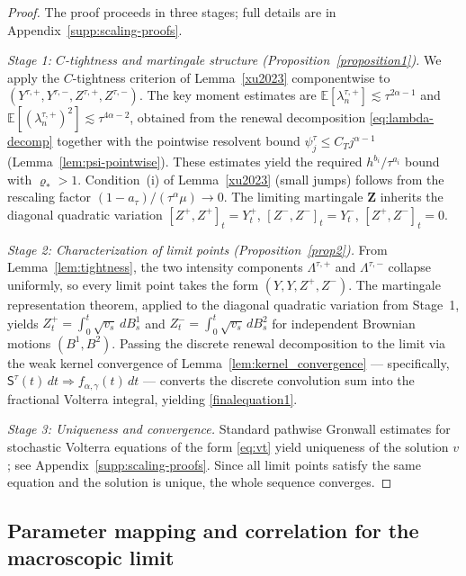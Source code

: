 \documentclass[letterpaper]{article}
\numberwithin{equation}{section}
\theoremstyle{definition}
\theoremstyle{remark}
\begin{document}
\begin{proof}
{The proof proceeds in three stages; full details are in Appendix~\ref{supp:scaling-proofs}.

\medskip
\noindent\textit{Stage 1: $C$-tightness and martingale structure (Proposition~\ref{proposition1}).}
We apply the $C$-tightness criterion of Lemma~\ref{xu2023} componentwise to $(Y^{\tau,+}, Y^{\tau,-}, Z^{\tau,+}, Z^{\tau,-})$. The key moment estimates are $\mathbb{E}[\lambda_n^{\tau,+}]\lesssim\tau^{2\alpha-1}$ and $\mathbb{E}[(\lambda_n^{\tau,+})^2]\lesssim\tau^{4\alpha-2}$, obtained from the renewal decomposition \eqref{eq:lambda-decomp} together with the pointwise resolvent bound $\psi_j^\tau\le C_T j^{\alpha-1}$ (Lemma~\ref{lem:psi-pointwise}). These estimates yield the required $h^{b_i}/\tau^{a_i}$ bound with $\varrho_*>1$. Condition~(i) of Lemma~\ref{xu2023} (small jumps) follows from the rescaling factor $(1-a_\tau)/(\tau^\alpha\mu)\to0$. The limiting martingale $\mathbf{Z}$ inherits the diagonal quadratic variation $[Z^+,Z^+]_t=Y_t^+$, $[Z^-,Z^-]_t=Y_t^-$, $[Z^+,Z^-]_t=0$.

\medskip
\noindent\textit{Stage 2: Characterization of limit points (Proposition~\ref{prop2}).}
From Lemma~\ref{lem:tightness}, the two intensity components $\Lambda^{\tau,+}$ and $\Lambda^{\tau,-}$ collapse uniformly, so every limit point takes the form $(Y, Y, Z^+, Z^-)$. The martingale representation theorem, applied to the diagonal quadratic variation from Stage~1, yields $Z^+_t=\int_0^t\sqrt{v_s}\,dB^1_s$ and $Z^-_t=\int_0^t\sqrt{v_s}\,dB^2_s$ for independent Brownian motions $(B^1,B^2)$. Passing the discrete renewal decomposition to the limit via the weak kernel convergence of Lemma~\ref{lem:kernel_convergence} — specifically, $\mathsf{S}^\tau(t)\,dt\Rightarrow f_{\alpha,\gamma}(t)\,dt$ — converts the discrete convolution sum into the fractional Volterra integral, yielding \eqref{finalequation1}.

\medskip
\noindent\textit{Stage 3: Uniqueness and convergence.}
Standard pathwise Gronwall estimates for stochastic Volterra equations of the form \eqref{eq:vt} yield uniqueness of the solution $v$; see Appendix~\ref{supp:scaling-proofs}. Since all limit points satisfy the same equation and the solution is unique, the whole sequence converges.}
\end{proof}

\subsection{Parameter mapping and correlation for the macroscopic limit}
\end{document}
